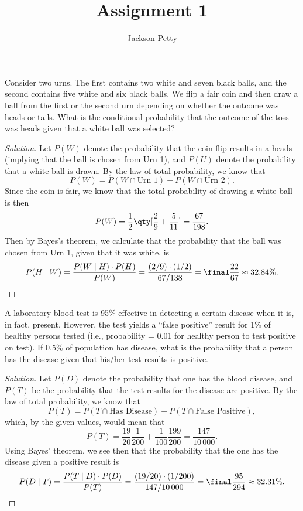 \documentclass[10pt, physics, diagram]{homework}
\title{Assignment 1}
\author{Jackson Petty}
\begin{document}
	\begin{problem}[4pts]
		Consider two urns. The first contains two white and seven black balls, and the second contains five white and six black balls. We flip a fair coin and then draw a ball from the first or the second urn depending on whether the outcome was heads or tails. What is the conditional probability that the outcome of the toss was heads given that a white ball was selected?
	\end{problem}
	\begin{proof}[Solution]
		Let $P(W)$ denote the probability that the coin flip results in a heads (implying that the ball is chosen from Urn 1), and $P(U)$ denote the probability that a white ball is drawn.
		By the law of total probability, we know that 
		\[ P(W) = P(W \cap \text{Urn 1}) + P(W \cap \text{Urn 2}). \]
		Since the coin is fair, we know that the total probability of drawing a white ball is then
		\[ P(W) = \frac{1}{2}\qty[\frac{2}{9} + \frac{5}{11}] = \frac{67}{198}. \]
		Then by Bayes's theorem, we calculate that the probability that the ball was chosen from Urn 1, given that it was white, is
		\[ P(H \mid W) = \frac{P(W \mid H) \cdot P(H)}{P(W)} = \frac{(2/9) \cdot (1/2)}{67/138} = \final{\frac{22}{67} \approx 32.84\%.}\qedhere \]
	\end{proof}

	\begin{problem}[4pts]
		A laboratory blood test is 95\% effective in detecting a certain disease when it is, in fact, present. However, the test yields a ``false positive'' result for 1\% of healthy persons tested (i.e., probability = 0.01 for healthy person to test positive on test). If 0.5\% of population has disease, what is the probability that a person has the disease given that his/her test results is positive.
	\end{problem}
	\begin{proof}[Solution]
		Let $P(D)$ denote the probability that one has the blood disease, and $P(T)$ be the probability that the test results for the disease are positive.
		By the law of total probability, we know that 
		\[ P(T) = P(T \cap \text{Has Disease}) + P(T \cap \text{False Positive}), \]
		which, by the given values, would mean that 
		\[ P(T) = \frac{19}{20}\frac{1}{200} + \frac{1}{100}\frac{199}{200} = \frac{147}{10\,000}. \]
		Using Bayes' theorem, we see then that the probability that the one has the disease given a positive result is 
		\[ P(D \mid T) = \frac{P(T \mid D)\cdot P(D)}{P(T)} = \frac{(19/20)\cdot(1/200)}{147/10\,000} = \final{\frac{95}{294} \approx 32.31\%.}\qedhere \]
	\end{proof}
\end{document}
